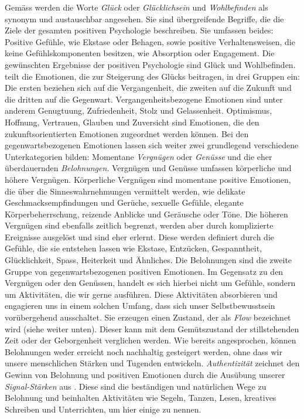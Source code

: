 Gemäss  werden die Worte \textit{Glück} oder \textit{Glücklichsein} und \textit{Wohlbefinden} als synonym und austauschbar angesehen. Sie sind übergreifende Begriffe, die die Ziele der gesamten positiven Psychologie beschreiben. Sie umfassen beides: Positive Gefühle, wie Ekstase oder Behagen, sowie positive Verhaltensweisen, die keine Gefühlskomponenten besitzen, wie Absorption oder Engagement. Die gewünschten Ergebnisse der positiven Psychologie sind Glück und Wohlbefinden.\\
 teilt die Emotionen, die zur Steigerung des Glücks beitragen, in drei Gruppen ein: Die ersten beziehen sich auf die Vergangenheit, die zweiten auf die Zukunft und die dritten auf die Gegenwart. Vergangenheitsbezogene Emotionen sind unter anderem Genugtuung, Zufriedenheit, Stolz und Gelassenheit. Optimismus, Hoffnung, Vertrauen, Glauben und Zuversicht sind Emotionen, die den zukunftsorientierten Emotionen zugeordnet werden können. Bei den gegenwartsbezogenen Emotionen lassen sich weiter zwei grundlegend verschiedene Unterkategorien bilden: Momentane \textit{Vergnügen} oder \textit{Genüsse} und die eher überdauernden \textit{Belohnungen}. Vergnügen und Genüsse umfassen körperliche und höhere Vergnügen. Körperliche Vergnügen sind momentane positive Emotionen, die über die Sinneswahrnehmungen vermittelt werden, wie delikate Geschmacksempfindungen und Gerüche, sexuelle Gefühle, elegante Körperbeherrschung, reizende Anblicke und Geräusche oder Töne. Die höheren Vergnügen sind ebenfalls zeitlich begrenzt, werden aber durch komplizierte Ereignisse ausgelöst und sind eher erlernt. Diese werden definiert durch die Gefühle, die sie entstehen lassen wie Ekstase, Entzücken, Gespanntheit, Glücklichkeit, Spass, Heiterkeit und Ähnliches. Die Belohnungen sind die zweite Gruppe von gegenwartsbezogenen positiven Emotionen. Im Gegensatz zu den Vergnügen oder den Genüssen, handelt es sich hierbei nicht um Gefühle, sondern um Aktivitäten, die wir gerne ausführen. Diese Aktivitäten absorbieren und engagieren uns in einem solchen Umfang, dass sich unser Selbstbewusstsein vorübergehend ausschaltet. Sie erzeugen einen Zustand, der als \textit{Flow} bezeichnet wird (siehe weiter unten). Dieser kann mit dem Gemütszustand der stillstehenden Zeit oder der Geborgenheit verglichen werden. Wie bereits angesprochen, können Belohnungen weder erreicht noch nachhaltig gesteigert werden, ohne dass wir unsere menschlichen Stärken und Tugenden entwickeln. \textit{Authentizität} zeichnet den Gewinn von Belohnung und positiven Emotionen durch die Ausübung unserer \textit{Signal-Stärken} aus \cite{Seligman2003}. Diese sind die beständigen und natürlichen Wege zu Belohnung und beinhalten Aktivitäten wie Segeln, Tanzen, Lesen, kreatives Schreiben und Unterrichten, um hier einige zu nennen.
